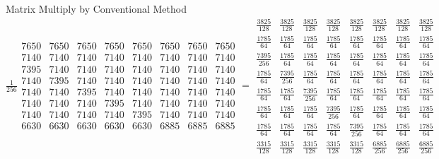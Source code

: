 \documentclass{article}
\begin{document}
Matrix Multiply by Conventional Method \newline
$\frac{1}{256} 
\begin{array}{cccccccc}
7650 & 7650 & 7650 & 7650 & 7650 & 7650 & 7650 & 7650 \\ 
7140 & 7140 & 7140 & 7140 & 7140 & 7140 & 7140 & 7140 \\ 
7395 & 7140 & 7140 & 7140 & 7140 & 7140 & 7140 & 7140 \\ 
7140 & 7395 & 7140 & 7140 & 7140 & 7140 & 7140 & 7140 \\ 
7140 & 7140 & 7395 & 7140 & 7140 & 7140 & 7140 & 7140 \\ 
7140 & 7140 & 7140 & 7395 & 7140 & 7140 & 7140 & 7140 \\ 
7140 & 7140 & 7140 & 7140 & 7395 & 7140 & 7140 & 7140 \\ 
6630 & 6630 & 6630 & 6630 & 6630 & 6885 & 6885 & 6885
\end{array}
=\allowbreak 
\begin{array}{cccccccc}
\frac{3825}{128} & \frac{3825}{128} & \frac{3825}{128} & \frac{3825}{128} & 
\frac{3825}{128} & \frac{3825}{128} & \frac{3825}{128} & \frac{3825}{128} \\ 
\frac{1785}{64} & \frac{1785}{64} & \frac{1785}{64} & \frac{1785}{64} & 
\frac{1785}{64} & \frac{1785}{64} & \frac{1785}{64} & \frac{1785}{64} \\ 
\frac{7395}{256} & \frac{1785}{64} & \frac{1785}{64} & \frac{1785}{64} & 
\frac{1785}{64} & \frac{1785}{64} & \frac{1785}{64} & \frac{1785}{64} \\ 
\frac{1785}{64} & \frac{7395}{256} & \frac{1785}{64} & \frac{1785}{64} & 
\frac{1785}{64} & \frac{1785}{64} & \frac{1785}{64} & \frac{1785}{64} \\ 
\frac{1785}{64} & \frac{1785}{64} & \frac{7395}{256} & \frac{1785}{64} & 
\frac{1785}{64} & \frac{1785}{64} & \frac{1785}{64} & \frac{1785}{64} \\ 
\frac{1785}{64} & \frac{1785}{64} & \frac{1785}{64} & \frac{7395}{256} & 
\frac{1785}{64} & \frac{1785}{64} & \frac{1785}{64} & \frac{1785}{64} \\ 
\frac{1785}{64} & \frac{1785}{64} & \frac{1785}{64} & \frac{1785}{64} & 
\frac{7395}{256} & \frac{1785}{64} & \frac{1785}{64} & \frac{1785}{64} \\ 
\frac{3315}{128} & \frac{3315}{128} & \frac{3315}{128} & \frac{3315}{128} & 
\frac{3315}{128} & \frac{6885}{256} & \frac{6885}{256} & \frac{6885}{256}
\end{array}
$ \newline
\end{document}
